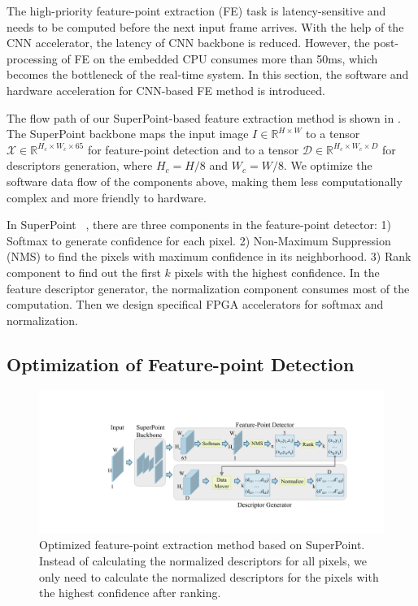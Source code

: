 \label{sec:hardsoftcodesign}
\label{subsec:FEopt}

The high-priority feature-point extraction (FE) task is latency-sensitive and needs to be computed before the next input frame arrives. With the help of the CNN accelerator, the latency of CNN backbone is reduced. However, the post-processing of FE on the embedded CPU consumes more than 50ms, which becomes the bottleneck of the real-time system. In this section, the software and hardware acceleration for CNN-based FE method is introduced.


The flow path of our SuperPoint-based feature extraction method is shown in . 
The SuperPoint backbone maps the input image $I\in \mathbb{R}^{H\times W}$ to a tensor $\mathcal{X}\in \mathbb{R}^{H_c\times W_c\times 65}$ for feature-point detection and to a tensor $\mathcal{D}\in \mathbb{R}^{H_c\times W_c\times D}$ for descriptors generation, where $H_c = H/8$ and $W_c = W/8$.
We optimize the software data flow of the components above, making them less computationally complex and more friendly to hardware. 

In SuperPoint  ~\cite{detone2018superpoint}, there are three components in the feature-point detector: 1) Softmax to generate confidence for each pixel. 2) Non-Maximum Suppression (NMS) to find the pixels with maximum confidence in its neighborhood. 3) Rank component to find out the first $k$ pixels with the highest confidence. 
In the feature descriptor generator, the normalization component consumes most of the computation. 
Then we design specifical FPGA accelerators for softmax and normalization.

\subsection{Optimization of Feature-point Detection}
\label{sec:softmaxopt}

\begin{figure}[t]
    \centering  
    \includegraphics[width=0.99\linewidth]{fig/superpoint.pdf}
    \vspace{-8mm}
    \caption{Optimized feature-point extraction method based on SuperPoint. Instead of calculating the normalized descriptors for all pixels, we only need to calculate the normalized descriptors for the pixels with the highest confidence after ranking.}
    \label{fig:superpoint}
\end{figure}

